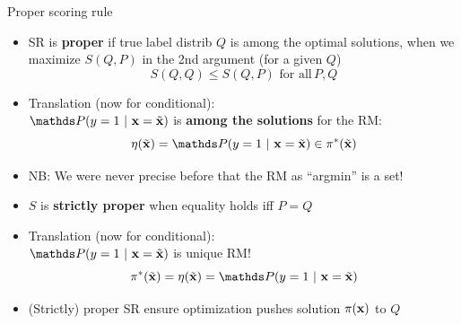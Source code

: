 \documentclass[11pt,compress,t,notes=noshow, xcolor=table]{beamer}
\begin{document}
\begin{vbframe}{Proper scoring rule }

\begin{itemize}

\item SR is \textbf{proper} if true label distrib $Q$ is among the optimal 
solutions, when we maximize $S(Q, P)$ in the 2nd argument (for a given $Q$)
$$S(Q,Q) \leq S(Q, P) \,\, \text{for all} \, P,Q $$

\item Translation (now for conditional): \\
$\P(y = 1 ~|~ \xv = \xtil)$ is \textbf{among the solutions} for the RM: 
$$
   \eta(\xtil) = \P(y = 1 ~|~ \xv = \xtil) \in \piastxtil
$$

\item NB: We were never precise before that the RM as ``argmin'' is a set!

\item $S$ is \textbf{strictly proper} when equality holds iff $P=Q$

\item Translation (now for conditional): \\
$\P(y = 1 ~|~ \xv = \xtil)$ is unique RM! 
$$
   \piastxtil = \eta(\xtil) = \P(y = 1 ~|~ \xv = \xtil)
$$

\item (Strictly) proper SR ensure optimization pushes solution $\pi(\mathbf{x})$ to $Q$ 



\end{itemize}


\end{vbframe}
\end{document}
